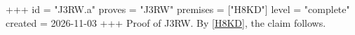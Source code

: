 +++
id = "J3RW.a"
proves = "J3RW"
premises = ["H8KD"]
level = "complete"
created = 2026-11-03
+++
Proof of J3RW. By \ref{H8KD}, the claim follows.
